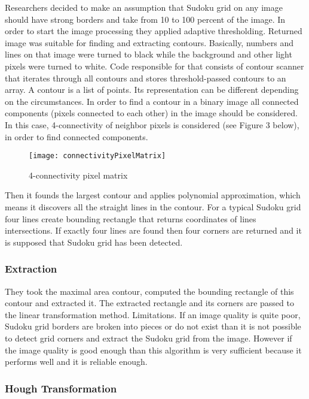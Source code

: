 \documentclass[../../main]{subfiles}
\begin{document}
Researchers decided to make an assumption that Sudoku grid on any image should have strong borders and take from 10 to 100 percent of the image.
In order to start the image processing they applied adaptive thresholding. Returned image was suitable for finding and extracting contours. Basically, numbers and lines on that image were turned to black while the background and other light pixels were turned to white. 
Code responsible for that consists of contour scanner that iterates through all contours and stores threshold-passed contours to an array. 
A contour is a list of points. Its representation can be different depending on the circumstances.
In order to find a contour in a binary image all connected components (pixels connected to each other) in the image should be considered. In this case, 4-connectivity of neighbor pixels is considered (see Figure 3 below), in order to find connected components.

\begin{figure} [ht]
\begin{center}
\texttt{[image: connectivityPixelMatrix]}
\caption{4-connectivity pixel matrix}
\label{fig:connectivityPixelMatrix}
\end{center}
\end{figure}

Then it founds the largest contour and applies polynomial approximation, which means it discovers all the straight lines in the contour. For a typical Sudoku grid four lines create bounding rectangle that returns coordinates of lines intersections. If exactly four lines are found then four corners are returned and it is supposed that Sudoku grid has been detected.

\subsubsection{Extraction}

They took the maximal area contour, computed the bounding rectangle of this contour and extracted it. The extracted rectangle and its corners are passed to the linear transformation method.
Limitations. If an image quality is quite poor, Sudoku grid borders are broken into pieces or do not exist than it is not possible to detect grid corners and extract the Sudoku grid from the image. However if the image quality is good enough than this algorithm is very sufficient because it performs well and it is reliable enough.

\subsubsection{Hough Transformation}
\end{document}
